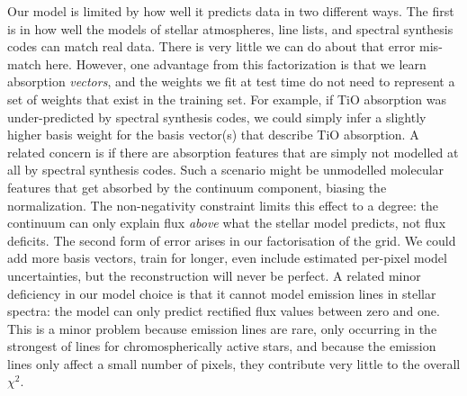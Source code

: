 \documentclass[modern,linenumbers]{aastex631}
\renewcommand{\added}[1]{#1}
\begin{document}
Our model is limited by how well it predicts data in two different ways. The first is in how well the models of stellar atmospheres, line lists, and spectral synthesis codes can match real data. There is very little we can do about that error mis-match here. \added{However, one advantage from this factorization is that we learn absorption \emph{vectors}, and the weights we fit at test time do not need to represent a set of weights that exist in the training set. For example, if TiO absorption was under-predicted by spectral synthesis codes, we could simply infer a slightly higher basis weight for the basis vector(s) that describe TiO absorption. A related concern is if there are absorption features that are simply not modelled at all by spectral synthesis codes. Such a scenario might be unmodelled molecular features that get absorbed by the continuum component, biasing the normalization. The non-negativity constraint limits this effect to a degree: the continuum can only explain flux \emph{above} what the stellar model predicts, not flux deficits.} The second form of error arises in our factorisation of the grid. We could add more basis vectors, train for longer, even include estimated per-pixel model uncertainties, but the reconstruction will never be perfect. A related minor deficiency in our model choice is that it cannot model emission lines in stellar spectra: the model can only predict rectified flux values between zero and one. This is a minor problem because emission lines are rare, only occurring in the strongest of lines for chromospherically active stars, and because the emission lines only affect a small number of pixels, they contribute very little to the overall $\chi^2$.\\
\end{document}
